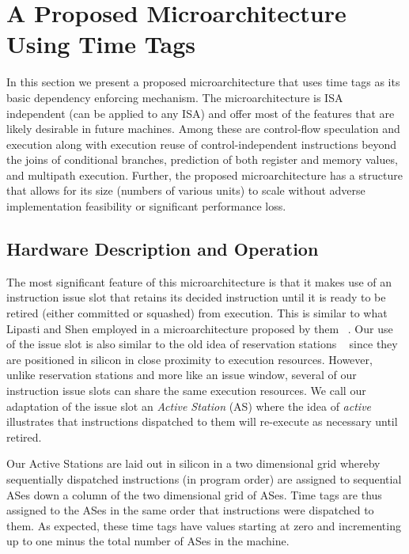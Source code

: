 \documentclass[10pt,dvips]{article}
\begin{document}
\section{A Proposed Microarchitecture Using Time Tags}
%
In this section we present a proposed microarchitecture
that uses time tags as its basic dependency enforcing mechanism.
The microarchitecture is ISA independent (can be applied to
any ISA) and offer most of the features that are likely desirable
in future machines.  Among these are control-flow speculation
and execution along with execution reuse of control-independent
instructions beyond the joins of conditional branches,
prediction of both register and memory values, and multipath execution.
Further, the proposed microarchitecture has a structure that allows
for its size (numbers of various units) to scale without adverse
implementation feasibility or significant performance loss.
%
%
\subsection{Hardware Description and Operation}
%
The most significant feature of this microarchitecture is
that it makes use of an instruction issue slot that retains
its decided instruction until it is ready to be retired 
(either committed or squashed) from execution.
This is similar to what Lipasti and Shen employed in a microarchitecture
proposed by them ~\cite{Lip97}.
Our use of the issue slot is also similar to the old idea
of reservation stations ~\cite{Tom67} since they are positioned
in silicon in close proximity to execution resources.  However,
unlike reservation stations and more like an issue window,
several of our instruction issue slots can share the same
execution resources.
We call our adaptation of the issue slot an 
{\em Active Station} (AS) where the idea of \textit{active}
illustrates that instructions dispatched to them will
re-execute as necessary until retired.  

Our Active Stations are laid out in silicon 
in a two dimensional grid whereby sequentially
dispatched instructions (in program order) are assigned to 
sequential ASes down a column of
the two dimensional grid of ASes.  
Time tags are thus assigned to the ASes in the same order
that instructions were dispatched to them.
As expected, these time tags have values starting at zero
and
incrementing up to one minus the total number of
ASes in the machine.
\end{document}

